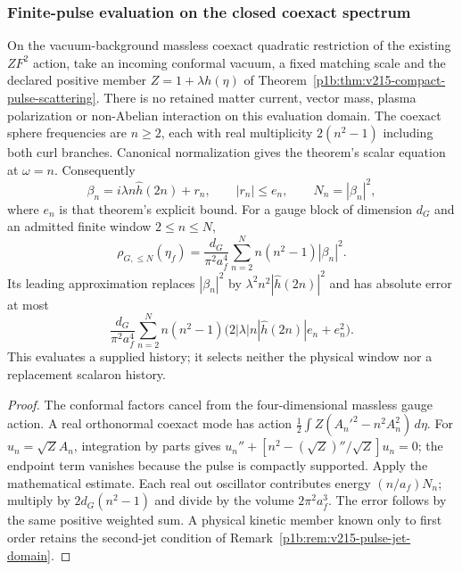 \documentclass[12pt,a4paper]{article}
\begin{document}
\subsubsection{Finite-pulse evaluation on the closed coexact spectrum}
\label{p9:sec:v215-finite-pulse-application}
\begin{corollary}
\label{p9:cor:v215-geometric-pulse-production}
On the vacuum-background massless coexact quadratic restriction of the
existing $Z F^2$ action, take an incoming conformal vacuum, a fixed
matching scale and the declared positive member
$Z=1+\lambda h(\eta)$ of
Theorem~\ref{p1b:thm:v215-compact-pulse-scattering}.
There is no retained matter current, vector mass, plasma polarization
or non-Abelian interaction on this evaluation domain. The coexact
sphere frequencies are $n\ge2$, each with real multiplicity
$2(n^2-1)$ including both curl branches. Canonical normalization gives
the theorem's scalar equation at $\omega=n$. Consequently
\[
 \beta_n=i\lambda n\widehat h(2n)+r_n,\qquad |r_n|\le e_n,
 \qquad N_n=|\beta_n|^2,
\]
where $e_n$ is that theorem's explicit bound. For a gauge block of
dimension $d_G$ and an admitted finite window $2\le n\le N$,
\[
 \boxed{\rho_{G,\le N}(\eta_f)=\frac{d_G}{\pi^2a_f^4}
       \sum_{n=2}^N n(n^2-1)|\beta_n|^2.}
\]
Its leading approximation replaces $|\beta_n|^2$ by
$\lambda^2n^2|\widehat h(2n)|^2$ and has absolute error at most
\[
 \frac{d_G}{\pi^2a_f^4}\sum_{n=2}^N n(n^2-1)
       \bigl(2|\lambda|n|\widehat h(2n)|e_n+e_n^2\bigr).
\]
This evaluates a supplied history; it selects neither the physical
window nor a replacement scalaron history.
\end{corollary}
\begin{proof}
The conformal factors cancel from the four-dimensional massless gauge
action. A real orthonormal coexact mode has action
$\frac12\int Z(A_n'^2-n^2A_n^2)\,d\eta$.
For $u_n=\sqrt Z A_n$, integration by parts gives
$u_n''+[n^2-(\sqrt Z)''/\sqrt Z]u_n=0$; the endpoint term vanishes
because the pulse is compactly supported. Apply the mathematical
estimate. Each real out oscillator contributes energy $(n/a_f)N_n$;
multiply by $2d_G(n^2-1)$ and divide by the volume $2\pi^2a_f^3$.
The error follows by the same positive weighted sum. A physical kinetic
member known only to first order retains the second-jet condition of
Remark~\ref{p1b:rem:v215-pulse-jet-domain}.
\end{proof}
\end{document}
